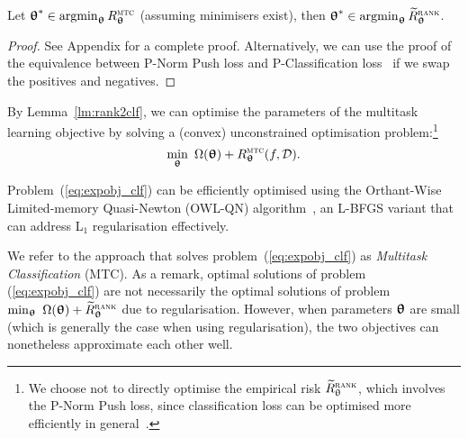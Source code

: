\begin{lemma}
\label{lm:rank2clf}
Let ${\bm{\uptheta}}^* \in \operatorname*{argmin}_{{\bm{\uptheta}}} R_{{\bm{\uptheta}}}^{\textsc{mtc}}$ (assuming minimisers exist),
then ${\bm{\uptheta}}^* \in \operatorname*{argmin}_{{\bm{\uptheta}}} \widetilde R_{{\bm{\uptheta}}}^{\textsc{rank}}$.
\end{lemma}

\begin{proof}
See Appendix for a complete proof.
Alternatively, 
we can use the proof of the equivalence between P-Norm Push loss and P-Classification loss~\cite{ertekin2011equivalence}
if we swap the positives and negatives.
\end{proof}


By Lemma~\ref{lm:rank2clf}, %
we can optimise the parameters of the multitask learning objective by 
solving a (convex) unconstrained optimisation problem:\footnote{We choose not to directly optimise 
the empirical risk $\widetilde R_{\uptheta}^{\textsc{rank}}$, which involves the P-Norm Push loss, %
since classification loss can be optimised more efficiently in general~\cite{ertekin2011equivalence}.}
\begin{equation}
\label{eq:expobj_clf}
\min_{\bm{\uptheta}} \ \Omega({\bm{\uptheta}}) + R_{{\bm{\uptheta}}}^{\textsc{mtc}}(f, \mathcal{D}).
\end{equation}

Problem~(\ref{eq:expobj_clf}) can be efficiently optimised using the
Orthant-Wise Limited-memory Quasi-Newton (OWL-QN) algorithm~\cite{andrew2007scalable},
an L-BFGS variant that can address L$_1$ regularisation effectively.

We refer to the approach that solves problem~(\ref{eq:expobj_clf}) as \emph{Multitask Classification} (MTC). %
As a remark, optimal solutions of problem (\ref{eq:expobj_clf}) are not necessarily the optimal solutions 
of problem $\min_{\bm{\uptheta}} \ \Omega({\bm{\uptheta}}) + \widetilde R_{{\bm{\uptheta}}}^{\textsc{rank}}$ due to regularisation. %
However, when parameters ${\bm{\uptheta}}$ are small (which is generally the case when using regularisation), the two objectives 
can nonetheless approximate each other well. %


